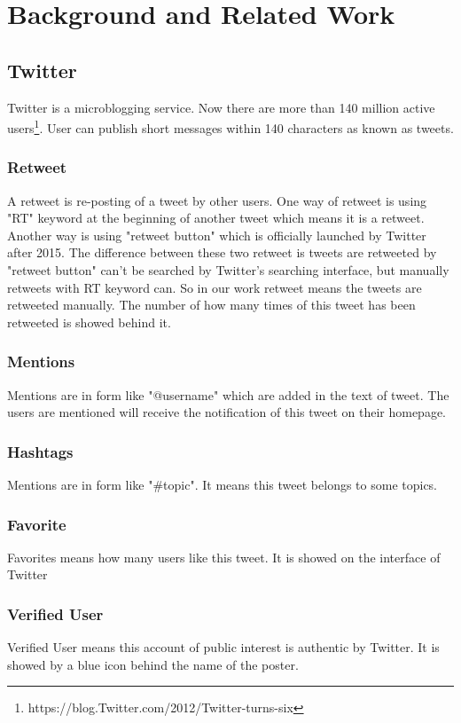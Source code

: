 \chapter{Background and Related Work} %
\label{cha:Related_Work}
\section{Twitter}
Twitter is a microblogging service. Now there are more than 140 million active users\footnote{https://blog.Twitter.com/2012/Twitter-turns-six}. User can publish short messages within 140 characters as known as tweets.
\subsection{Retweet}
A retweet is re-posting of a tweet by other users. One way of retweet is using "RT" keyword at the beginning of another tweet which means it is a retweet. Another way is using "retweet button" which is officially launched by Twitter after 2015. The difference between these two retweet is tweets are retweeted by "retweet button" can't be searched by Twitter's searching interface, but manually retweets with RT keyword can. So in our work retweet means the tweets are retweeted manually. The number of how many times of this tweet has been retweeted is showed behind it.

\subsection{Mentions}
Mentions are in form like "@username" which are added in the text of tweet. The users are mentioned will receive the notification of this tweet on their homepage.
\subsection{Hashtags}
Mentions are in form like "\#topic". It means this tweet belongs to some topics.

\subsection{Favorite}
Favorites means how many users like this tweet. It is showed on the interface of Twitter
\subsection{Verified User}
Verified User means this account of public interest is authentic by Twitter. It is showed by a blue icon behind the name of the poster.
